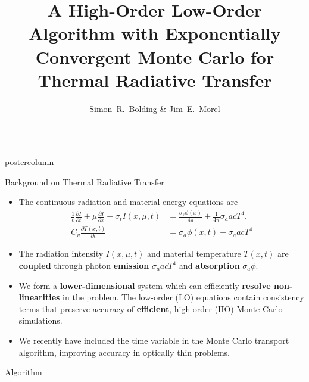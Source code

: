 \documentclass[xcolor=dvipsnames]{beamer}
\title{\color{black}A High-Order Low-Order Algorithm with Exponentially Convergent Monte Carlo for Thermal Radiative Transfer}
\author{\large Simon~R.~Bolding \& Jim~E.~Morel}
\institute{Department of Nuclear Engineering,
Texas A\&M University -- CERT Project}
\newcommand{\pderiv}[2]{\frac{\partial #1}{\partial #2}}
\newlength{\columnheight}
\begin{document}
\begin{frame}
\begin{columns}

\begin{column}{.49\textwidth}
\begin{beamercolorbox}[center,wd=\textwidth]{postercolumn}
\begin{minipage}[T]{0.95\textwidth} %
\parbox[t][\columnheight]{\textwidth}{ %
       \begin{block}{Background on Thermal Radiative Transfer}
         \begin{itemize}
             \setlength{\itemsep}{0.6em}
             \item The continuous radiation and material energy
                 equations are
\begin{align}
    \frac{1}{c}\pderiv{I}{t} + \mu \pderiv{I}{x} + \sigma_t I(x,\mu,t)
    &= \frac{\sigma_s \phi(x)}{4\pi} +  \frac{1}{4\pi} \sigma_a a c T^4,\label{ho_trans}
  \\
  C_v \pderiv{T(x,t)}{t} &=  {\sigma_a \phi(x,t)} - {\sigma_a a c T^4} \label{lo_mat}
\end{align}
     \item The radiation intensity $I(x,\mu,t)$ and material temperature
         $T(x,t)$ are
         \textbf{coupled}
         through photon \textbf{emission} $\sigma_a a c T^4$ and
         \textbf{absorption} $\sigma_a \phi$.
      \item We form a \textbf{lower-dimensional} system which can
          efficiently \textbf{resolve non-linearities} in the problem.  The low-order
          (LO) equations contain consistency terms that preserve accuracy
          of \textbf{efficient}, high-order (HO) Monte Carlo simulations.
      \item We recently have included the time variable in the Monte Carlo transport algorithm,
          improving accuracy in optically thin problems.
      \end{itemize}
         \end{block}
         \vfill
	\begin{block}{Algorithm}

\end{block}}
\end{minipage}
\end{beamercolorbox}
\end{column}
\end{columns}
\end{frame}
\end{document}
